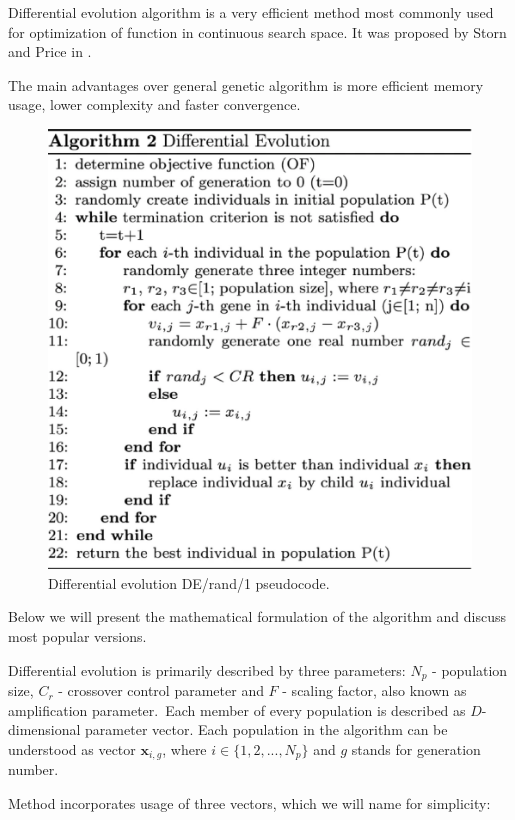 \documentclass[12pt,a4paper,openany]{book}
\begin{document}
Differential evolution algorithm is a very efficient method most commonly used for optimization of function in continuous search space. It was proposed by Storn and Price in \cite{de}.

The main advantages over general genetic algorithm is more efficient memory usage, lower complexity and faster convergence.

 \begin{figure}[ht!]
     \centering
     \includegraphics[scale=0.5]{figs/diff-evo.eps}
     \caption{Differential evolution DE/rand/1 pseudocode.}\label{Fig:PROGAN}
 \end{figure}

Below we will present the mathematical formulation of the algorithm and discuss most popular versions.

Differential evolution is primarily described by three parameters: $N_{p}$ - population size, $C_{r}$ - crossover control parameter and $F$ - scaling factor, also known as amplification parameter.\
Each member of every population is described as $D$-dimensional parameter vector. Each population in the algorithm can be understood as vector $\textbf{x}_{i, g}$, where $i \in \{1, 2, ..., N_{p}\}$ and $g$ stands for generation number.

\noindent Method incorporates usage of three vectors, which we will name for simplicity:
\end{document}
